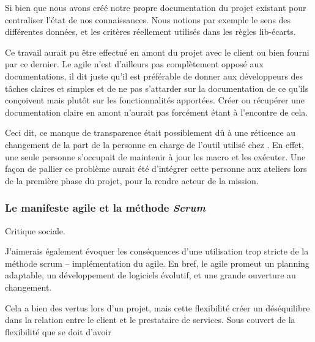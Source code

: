  Si bien que nous avons créé notre propre documentation du projet existant pour centraliser l'état de nos connaissances. Nous notions par exemple le sens des différentes données, et les critères réellement utilisés dans les règles lib-écarts.

Ce travail aurait pu être effectué en amont du projet avec le client ou bien fourni par ce dernier. Le \gls{agile} n'est d'ailleurs pas complètement opposé aux documentations, il dit juste qu'il est préférable de donner aux développeurs des tâches claires et simples et de ne pas s'attarder sur la documentation de ce qu'ils conçoivent mais plutôt sur les fonctionnalités apportées. Créer ou récupérer une documentation claire en amont n'aurait pas forcément étant à l'encontre de cela.

Ceci dit, ce manque de transparence était possiblement dû à une réticence au changement de la part de la personne en charge de l'outil utilisé chez \sncf. En effet, une seule personne s'occupait de maintenir à jour les macro et les exécuter. Une façon de pallier ce problème aurait été d'intégrer cette personne aux ateliers lors de la première phase du projet, pour la rendre acteur de la mission.

\subsubsection{Le manifeste agile et la méthode \textit{Scrum}}

Critique sociale.

J'aimerais également évoquer les conséquences d'une utilisation trop stricte de la méthode \gls{scrum} -- implémentation du \gls{agile}. En bref, le \gls{agile} promeut un planning adaptable, un développement de logiciels évolutif, et une grande ouverture au changement.

Cela a bien des vertus lors d'un projet, mais cette flexibilité créer un déséquilibre dans la relation entre le client et le prestataire de services. Sous couvert de la flexibilité que se doit d'avoir